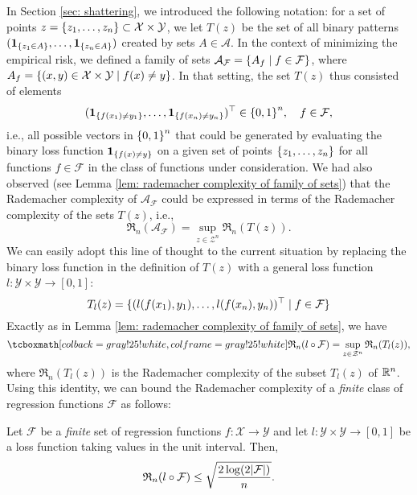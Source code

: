 In Section \ref{sec: shattering}, we introduced the following notation: for a set of points $z = \set{z_1, \dots, z_n} \subset \mathcal{X} \times \mathcal{Y}$, we let $T(z)$ be the set of all binary patterns $(\indSet{z_1 \in A}, \dots, \indSet{z_n \in A})$ created by sets $A \in \mathcal{A}$. In the context of minimizing the empirical risk, we defined a family of sets $\mathcal{A}_{\mathcal{F}} = \set{A_f \with f \in \mathcal{F}}$, where $A_f = \set{(x, y) \in \mathcal{X} \times \mathcal{Y} \with f(x) \neq y}$. In that setting, the set $T(z)$ thus consisted of elements
\[
    (\indSet{f(x_1) \neq y_1}, \dots, \indSet{f(x_n) \neq y_n})^{\top} \in \set{0, 1}^n, \quad f \in \mathcal{F},
\]
i.e., all possible vectors in $\set{0, 1}^n$ that could be generated by evaluating the binary loss function $\indSet{f(x) \neq y}$ on a given set of points $\set{z_1, \dots, z_n}$ for all functions $f \in \mathcal{F}$ in the class of functions under consideration. We had also observed (see Lemma \ref{lem: rademacher complexity of family of sets}) that the Rademacher complexity of $\mathcal{A}_{\mathcal{F}}$ could be expressed in terms of the Rademacher complexity of the sets $T(z)$, i.e.,
\[
    \mathfrak{R}_n(\mathcal{A}_{\mathcal{F}}) = \sup_{z \in \mathcal{Z}^n} \mathfrak{R}_n(T(z)).
\]
We can easily adopt this line of thought to the current situation by replacing the binary loss function in the definition of $T(z)$ with a general loss function $l \colon \mathcal{Y} \times \mathcal{Y} \to [0, 1]$:
\begin{equation}
    T_l(z) = \{(l(f(x_1), y_1), \dots, l(f(x_n), y_n))^{\top} \mathrel{|} f \in \mathcal{F}\}
\end{equation}
Exactly as in Lemma \ref{lem: rademacher complexity of family of sets}, we have
\begin{equation}
\label{eq: rademacher complexity for general loss}
    \highlightMath{
        \mathfrak{R}_n(l \circ \mathcal{F}) = \sup_{z \in \mathcal{Z}^n} \mathfrak{R}_n(T_l(z)),
    }
\end{equation}
where $\mathfrak{R}_n(T_l(z))$ is the Rademacher complexity of the subset $T_l(z)$ of $\mathbb{R}^n$. Using this identity, we can bound the Rademacher complexity of a \emph{finite} class of regression functions $\mathcal{F}$ as follows:

\begin{proposition}
\label{prop: bound on rademacher complexity for general loss}
Let $\mathcal{F}$ be a \emph{finite} set of regression functions $f \colon \mathcal{X} \to \mathcal{Y}$ and let $l \colon \mathcal{Y} \times \mathcal{Y} \to [0, 1]$ be a loss function taking values in the unit interval. Then,
\[
    \mathfrak{R}_n(l \circ \mathcal{F}) \leq \sqrt{\frac{2 \log(2 \abs{\mathcal{F}})}{n}}.
\]
\end{proposition}

